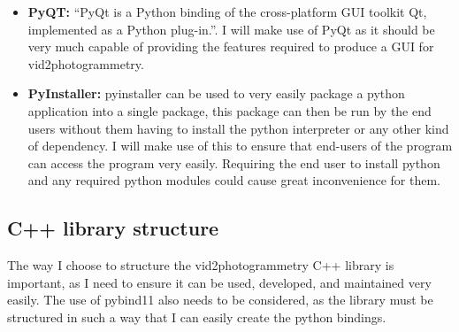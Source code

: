 \documentclass[11pt]{report}
\begin{document}
\begin{itemize}
\item \textbf{PyQT:} ``PyQt is a Python binding of the cross-platform GUI toolkit Qt, implemented as a Python plug-in.''. I will make use of PyQt as it should be very much capable of providing the features required to produce a GUI for vid2photogrammetry.
\item \textbf{PyInstaller:} pyinstaller can be used to very easily package a python application into a single package, this package can then be run by the end users without them having to install the python interpreter or any other kind of dependency. I will make use of this to ensure that end-users of the program can access the program very easily. Requiring the end user to install python and any required python modules could cause great inconvenience for them.
\end{itemize}
\subsection{C++ library structure}
The way I choose to structure the vid2photogrammetry C++ library is important, as I need to ensure it can be used, developed, and maintained very easily. The use of pybind11 also needs to be considered, as the library must be structured in such a way that I can easily create the python bindings.

\end{document}
